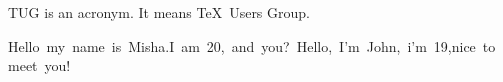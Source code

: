 \documentclass{article}
\begin{document}
\parbox{3cm}{%
TUG is an acronym. It means \TeX\ Users Group.}
\mbox{Hello my name is Misha.\\ I am 20, and you?
Hello, I'm John, i'm 19,\\ nice to meet you!}
\end{document}
